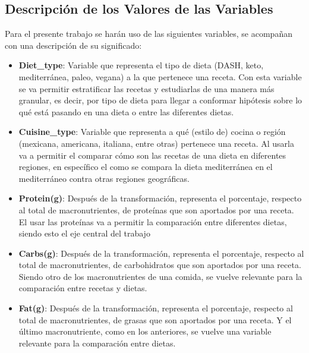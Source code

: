 \documentclass[12pt,a4paper]{article}
\begin{document}
    \subsection{Descripción de los Valores de las Variables}
    Para el presente trabajo se harán uso de las siguientes variables, se 
    acompañan con una descripción de su significado:
    \begin{itemize}[label=\textbullet]
        \item \textbf{Diet\_type}: Variable que representa el tipo de 
        dieta (DASH, keto, mediterránea, paleo, vegana) a la que 
        pertenece una receta. Con esta variable se va permitir estratificar 
        las recetas y estudiarlas de una manera más granular, es decir, 
        por tipo de dieta para llegar a conformar hipótesis sobre lo qué 
        está pasando en una dieta o entre las diferentes dietas.
        \item \textbf{Cuisine\_type}: Variable que representa a qué (estilo 
        de) cocina o región (mexicana, americana, italiana, entre otras) pertenece una 
        receta. Al usarla va a permitir el comparar cómo son las recetas 
        de una dieta en diferentes regiones, en específico el 
        como se compara la dieta mediterránea en el mediterráneo  
        contra otras regiones geográficas.
        \item \textbf{Protein(g)}: Después de la transformación, representa el 
        porcentaje, respecto al total de macronutrientes, de proteínas que son 
        aportados por una receta. El usar las proteínas va a permitir la 
        comparación entre diferentes dietas, siendo esto el eje central del trabajo
        \item \textbf{Carbs(g)}: Después de la transformación, representa el 
        porcentaje, respecto al total de macronutrientes, de carbohidratos que 
        son aportados por una receta. Siendo otro de los macronutrientes de una 
        comida, se vuelve relevante para la comparación entre recetas y dietas.
        \item \textbf{Fat(g)}: Después de la transformación, representa el 
        porcentaje, respecto al total de macronutrientes, de grasas que son 
        aportados por una receta. Y el último macronutriente, como en los 
        anteriores, se vuelve una variable relevante para la comparación entre dietas.
    \end{itemize}
\end{document}
